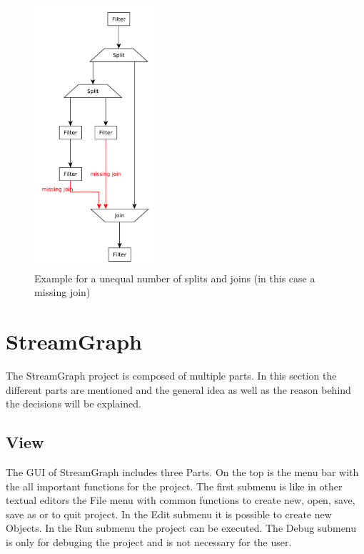 \documentclass[journal]{IEEEtran}
\begin{document}
\begin{figure}[h]
	\centering
	\includegraphics[width=0.4\textwidth]{StreamItTopologyMissingJoin}
	\caption{Example for a unequal number of splits and joins (in this case a missing join)}
	\label{fig_StreamIt_topology_missing_join}
\end{figure}


\section{StreamGraph}
\noindent The StreamGraph project is composed of multiple parts. In this section the 
different parts are mentioned and the general idea as well as the reason behind the 
decisions will be explained.
\subsection{View}
\noindent The GUI of StreamGraph includes three Parts. On the top is the menu
bar with the all important functions for the project. The first submenu is like in
other textual editors the File menu with common functions to create new, open, save,
save as or to quit project. In the Edit submenu it is possible to create new Objects.
In the Run submenu the project can be executed. The Debug submenu is only for debuging
the project and is not necessary for the user. \\
\end{document}
